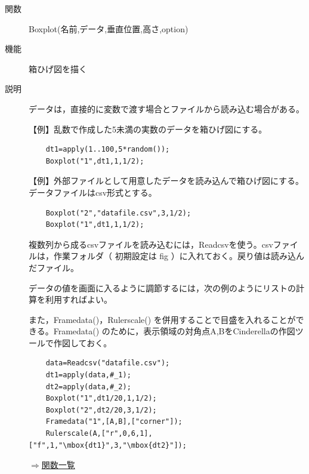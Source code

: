 \documentclass[papersize,a4paper,12pt,uplatex]{jsarticle}
\begin{document}
\begin{description}

\hypertarget{boxplot}{}
\item[関数]  Boxplot(名前,データ,垂直位置,高さ,option)
\item[機能]  箱ひげ図を描く
\item[説明]  データは，直接的に変数で渡す場合とファイルから読み込む場合がある。

\vspace{\baselineskip}
【例】乱数で作成した5未満の実数のデータを箱ひげ図にする。

\begin{verbatim}
    dt1=apply(1..100,5*random());
    Boxplot("1",dt1,1,1/2);
\end{verbatim}
\vspace{\baselineskip}
\hspace{20mm} 

\vspace{\baselineskip}
【例】外部ファイルとして用意したデータを読み込んで箱ひげ図にする。データファイルはcsv形式とする。
\begin{verbatim}
    Boxplot("2","datafile.csv",3,1/2);
    Boxplot("1",dt1,1,1/2);
\end{verbatim}
\vspace{\baselineskip}
複数列から成るcsvファイルを読み込むには，Readcsvを使う。csvファイルは，作業フォルダ（ 初期設定は fig ）に入れておく。戻り値は読み込んだファイル。
  
データの値を画面に入るように調節するには，次の例のようにリストの計算を利用すればよい。
 
また，Framedata()，Rulerscale() を併用することで目盛を入れることができる。Framedata() のために，表示領域の対角点A,BをCinderellaの作図ツールで作図しておく。

\begin{verbatim}
    data=Readcsv("datafile.csv");
    dt1=apply(data,#_1);
    dt2=apply(data,#_2);
    Boxplot("1",dt1/20,1,1/2);
    Boxplot("2",dt2/20,3,1/2);
    Framedata("1",[A,B],["corner"]);
    Rulerscale(A,["r",0,6,1],["f",1,"\mbox{dt1}",3,"\mbox{dt2}"]);
\end{verbatim}
 \begin{center}  \end{center}

\begin{flushright}  \hyperlink{functionlist}{$\Rightarrow$関数一覧}\end{flushright}


\end{description}
\end{document}
